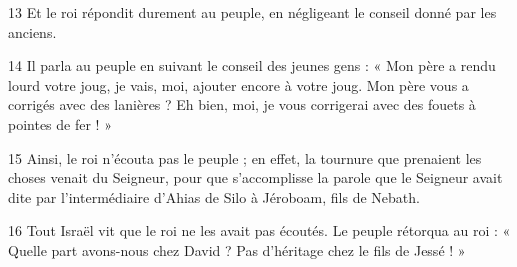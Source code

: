 
13 Et le roi répondit durement au peuple, en négligeant le conseil donné par les anciens.

14 Il parla au peuple en suivant le conseil des jeunes gens : « Mon père a rendu lourd votre joug, je vais, moi, ajouter encore à votre joug. Mon père vous a corrigés avec des lanières ? Eh bien, moi, je vous corrigerai avec des fouets à pointes de fer ! »

15 Ainsi, le roi n’écouta pas le peuple ; en effet, la tournure que prenaient les choses venait du Seigneur, pour que s’accomplisse la parole que le Seigneur avait dite par l’intermédiaire d’Ahias de Silo à Jéroboam, fils de Nebath.

16 Tout Israël vit que le roi ne les avait pas écoutés. Le peuple rétorqua au roi : « Quelle part avons-nous chez David ? Pas d’héritage chez le fils de Jessé ! »